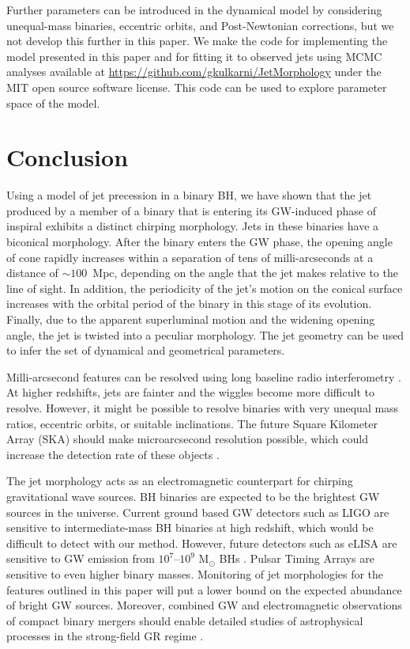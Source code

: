 \documentclass[a4paper,fleqn,usenatbib]{mnras}
\begin{document}
Further parameters can be introduced in the dynamical model by
considering unequal-mass binaries, eccentric orbits, and
Post-Newtonian corrections, but we not develop this further in this
paper.  We make the code for implementing the model presented in this
paper and for fitting it to observed jets using MCMC analyses
available at \url{https://github.com/gkulkarni/JetMorphology} under
the MIT open source software license.  This code can be used to
explore parameter space of the model.

\section{Conclusion}

Using a model of jet precession in a binary BH, we have shown that the
jet produced by a member of a binary that is entering its GW-induced
phase of inspiral exhibits a distinct chirping morphology.  Jets in
these binaries have a biconical morphology.  After the binary enters
the GW phase, the opening angle of cone rapidly increases within a
separation of tens of milli-arcseconds at a distance of $\sim
100$~Mpc, depending on the angle that the jet makes relative to the
line of sight.  In addition, the periodicity of the jet's motion on
the conical surface increases with the orbital period of the binary in
this stage of its evolution.  Finally, due to the apparent
superluminal motion and the widening opening angle, the jet is twisted
into a peculiar morphology.  The jet geometry can be used to infer the
set of dynamical and geometrical parameters.

Milli-arcsecond features can be resolved using long baseline radio
interferometry \citep{2001ChJAA...1..236Q}.  At higher redshifts, jets
are fainter and the wiggles become more difficult to resolve.
However, it might be possible to resolve binaries with very unequal
mass ratios, eccentric orbits, or suitable inclinations.  The future
Square Kilometer Array (SKA) should make microarcsecond resolution
possible, which could increase the detection rate of these objects
\citep{2014arXiv1412.5971P}.

The jet morphology acts as an electromagnetic counterpart for chirping
gravitational wave sources.  BH binaries are expected to be the
brightest GW sources in the universe.  Current ground based GW
detectors such as LIGO are sensitive to intermediate-mass BH binaries
at high redshift, which would be difficult to detect with our method.
However, future detectors such as eLISA are sensitive to GW emission
from $10^7$--$10^9$ M$_\odot$ BHs \citep{2013CQGra..30x4009S}.  Pulsar
Timing Arrays are sensitive to even higher binary masses.  Monitoring
of jet morphologies for the features outlined in this paper will put
a lower bound on the expected abundance of bright GW
sources. Moreover, combined GW and electromagnetic observations of
compact binary mergers should enable detailed studies of astrophysical
processes in the strong-field GR regime \citep{2005ApJ...629...15H}.
\end{document}
